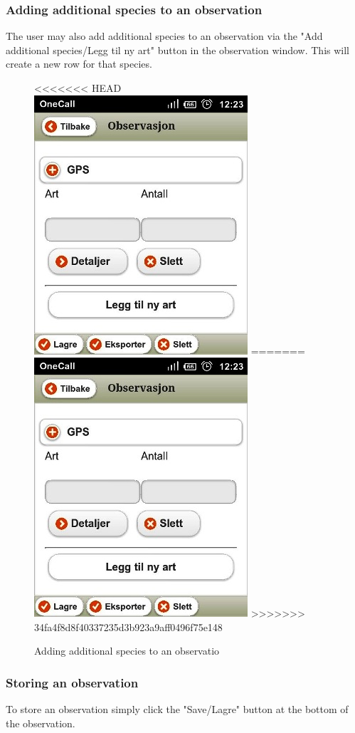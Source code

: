 \pagebreak

\subsubsection{Adding additional species to an observation}
The user may also add additional species to an observation via the "Add additional species/Legg til ny art" button in the  observation window. This will create a new row for that species.

\begin{figure}[h!]
\centering
<<<<<<< HEAD
 \includegraphics[scale=0.9]{appendix/pic/nyart.jpg}
=======
 \includegraphics[height=0.6\textwidth]{appendix/pic/nyart.jpg} 
>>>>>>> 34fa4f8d8f40337235d3b923a9aff0496f75e148
 \caption{Adding additional species to an observatio}
 \end{figure}

\subsubsection{Storing an observation}
To store an observation simply click the "Save/Lagre" button at the bottom of the observation.


